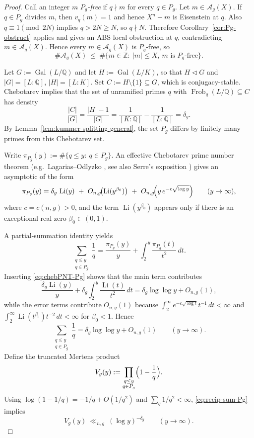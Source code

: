 \documentclass[11pt,letterpaper]{amsart}
\newcommand{\Z}{\mathbb{Z}}
\newcommand{\Q}{\mathbb{Q}}
\newcommand{\Li}{\operatorname{Li}}
\newcommand{\Gal}{\operatorname{Gal}}
\newcommand{\Frob}{\operatorname{Frob}}
\theoremstyle{plain}
\theoremstyle{definition}
\theoremstyle{remark}
\theoremstyle{plain}
\begin{document}
\begin{proof}

Call an integer $m$ \emph{$P_g$-free} if $q\nmid m$ for every $q\in P_g$.
Let $m\in\mathcal A_g(X)$. If $q\in P_g$ divides $m$, then $v_q(m)=1$ and hence $X^n-m$ is Eisenstein at $q$.
Also $q\equiv 1\pmod{2N}$ implies $q>2N\ge N$, so $q\nmid N$.
Therefore Corollary~\ref{cor:Pg-obstruct} applies and gives an ABS local obstruction at $q$,
contradicting $m\in\mathcal A_g(X)$. Hence every $m\in\mathcal A_g(X)$ is $P_g$-free, so
\begin{equation}
\label{eq:AgX-le-Pfree}
\#\mathcal A_g(X)\ \le\ \#\{m\in\Z:\ |m|\le X,\ \text{$m$ is $P_g$-free}\}.
\end{equation}

Let $G:=\Gal(L/\Q)$ and let $H:=\Gal(L/K)$, so that $H\lhd G$ and $|G|=[L:\Q]$, $|H|=[L:K]$.
Set $C:=H\setminus\{1\}\subseteq G$, which is conjugacy-stable.
Chebotarev implies that the set of unramified primes $q$ with $\Frob_q(L/\Q)\subseteq C$ has density
\[
\frac{|C|}{|G|}=\frac{|H|-1}{|G|}=\frac{1}{[K:\Q]}-\frac{1}{[L:\Q]}=\delta_g.
\]
By Lemma~\ref{lem:kummer-splitting-general}, the set $P_g$ differs by finitely many primes from this Chebotarev set.

Write $\pi_{P_g}(y):=\#\{q\le y:\ q\in P_g\}$.
An effective Chebotarev prime number theorem (e.g.\ Lagarias--Odlyzko \cite{LO77}, see also Serre's exposition \cite[\S3]{SerreChebotarev})
gives an asymptotic of the form
\begin{equation}
\label{eq:chebPNT-Pg}
\pi_{P_g}(y)
=
\delta_g\,\Li(y)
\ +\ O_{n,g}\!\bigl(\Li(y^{\beta_0})\bigr)
\ +\ O_{n,g}\!\Bigl(y\,e^{-c\sqrt{\log y}}\Bigr)
\qquad (y\to\infty),
\end{equation}
where $c=c(n,g)>0$, and the term $\Li(y^{\beta_0})$ appears only if there is an exceptional real zero $\beta_0\in(0,1)$.

A partial-summation identity yields
\[
\sum_{\substack{q\le y\\ q\in P_g}}\frac{1}{q}
=
\frac{\pi_{P_g}(y)}{y}+\int_{2}^{y}\frac{\pi_{P_g}(t)}{t^2}\,dt.
\]
Inserting \eqref{eq:chebPNT-Pg} shows that the main term contributes
\[
\frac{\delta_g\Li(y)}{y}+\delta_g\int_{2}^{y}\frac{\Li(t)}{t^2}\,dt
=
\delta_g\log\log y+O_{n,g}(1),
\]
while the error terms contribute $O_{n,g}(1)$ because
$\int_2^\infty e^{-c\sqrt{\log t}}t^{-1}\,dt<\infty$ and
$\int_2^\infty \Li(t^{\beta_0})t^{-2}\,dt<\infty$ for $\beta_0<1$.
Hence
\begin{equation}
\label{eq:recip-sum-Pg}
\sum_{\substack{q\le y\\ q\in P_g}}\frac{1}{q}
=
\delta_g\log\log y+O_{n,g}(1)
\qquad (y\to\infty).
\end{equation}
Define the truncated Mertens product
\[
V_g(y):=\prod_{\substack{q\le y\\ q\in P_g}}\Bigl(1-\frac{1}{q}\Bigr).
\]
Using $\log(1-1/q)=-1/q+O(1/q^2)$ and $\sum_q 1/q^2<\infty$, \eqref{eq:recip-sum-Pg} implies
\begin{equation}
\label{eq:Vg-logpower}
V_g(y)\ \ll_{n,g}\ (\log y)^{-\delta_g}
\qquad (y\to\infty).
\end{equation}



\end{proof}
\end{document}

